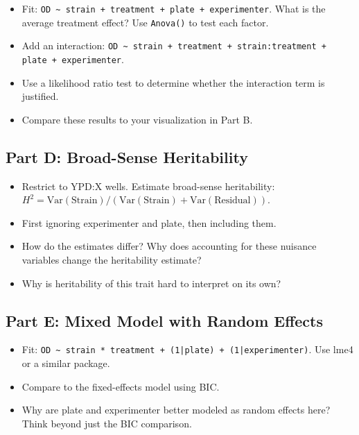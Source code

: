 \begin{dobox}[Tasks]
\begin{itemize}[nosep]
  \item Fit: \texttt{OD \textasciitilde{} strain + treatment + plate + experimenter}. What is the average treatment effect? Use \texttt{Anova()} to test each factor.
  \item Add an interaction: \texttt{OD \textasciitilde{} strain + treatment + strain:treatment + plate + experimenter}.
  \item Use a likelihood ratio test to determine whether the interaction term is justified.
  \item Compare these results to your visualization in Part B.
\end{itemize}
\end{dobox}

\subsection{Part D: Broad-Sense Heritability}

\begin{dobox}[Tasks]
\begin{itemize}[nosep]
  \item Restrict to YPD:X wells. Estimate broad-sense heritability: $H^2 = \text{Var}(\text{Strain}) / (\text{Var}(\text{Strain}) + \text{Var}(\text{Residual}))$.
  \item First ignoring experimenter and plate, then including them.
  \item How do the estimates differ? Why does accounting for these nuisance variables change the heritability estimate?
  \item Why is heritability of this trait hard to interpret on its own?
\end{itemize}
\end{dobox}

\subsection{Part E: Mixed Model with Random Effects}

\begin{dobox}[Tasks]
\begin{itemize}[nosep]
  \item Fit: \texttt{OD \textasciitilde{} strain * treatment + (1|plate) + (1|experimenter)}. Use lme4 or a similar package.
  \item Compare to the fixed-effects model using BIC.
  \item Why are plate and experimenter better modeled as random effects here? Think beyond just the BIC comparison.
\end{itemize}
\end{dobox}

